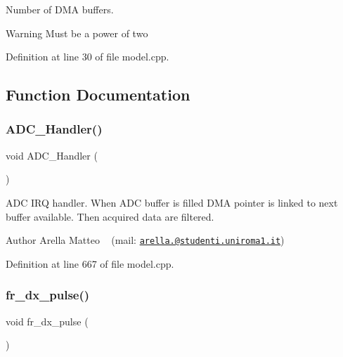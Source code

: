 Number of D\+MA buffers. 

\begin{DoxyWarning}{Warning}
Must be a power of two 
\end{DoxyWarning}


Definition at line 30 of file model.\+cpp.



\subsection{Function Documentation}
\mbox{\label{group___board__model__group_gaedc241164d501dcbc52cde232333c9cf}} 
\subsubsection{\texorpdfstring{A\+D\+C\+\_\+\+Handler()}{ADC\_Handler()}}
{\footnotesize\ttfamily void A\+D\+C\+\_\+\+Handler (\begin{DoxyParamCaption}{ }\end{DoxyParamCaption})}



A\+DC I\+RQ handler. When A\+DC buffer is filled D\+MA pointer is linked to next buffer available. Then acquired data are filtered. 

\begin{DoxyAuthor}{Author}
Arella Matteo ~\newline
 (mail\+: \href{mailto:arella.1646983@studenti.uniroma1.it}{\tt arella.@studenti.\+uniroma1.\+it}) 
\end{DoxyAuthor}


Definition at line 667 of file model.\+cpp.

\mbox{\label{group___board__model__group_ga809e754563f2877e3264fd49483ceac9}} 
\subsubsection{\texorpdfstring{fr\+\_\+dx\+\_\+pulse()}{fr\_dx\_pulse()}}
{\footnotesize\ttfamily void fr\+\_\+dx\+\_\+pulse (\begin{DoxyParamCaption}{ }\end{DoxyParamCaption})}



